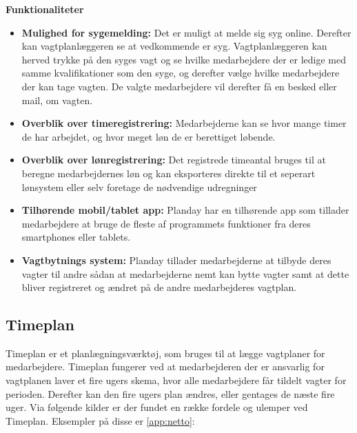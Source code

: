\noindent\textbf{Funktionaliteter}
\begin{itemize}
\item {\textbf{Mulighed for sygemelding:} Det er muligt at melde sig syg online. Derefter kan vagtplanlæggeren se at vedkommende er syg. Vagtplanlæggeren kan herved trykke på den syges vagt og se hvilke medarbejdere der er ledige med samme kvalifikationer som den syge, og derefter vælge hvilke medarbejdere der kan tage vagten. De valgte medarbejdere vil derefter få en besked eller mail, om vagten.}
\item {\textbf{Overblik over timeregistrering:} Medarbejderne kan se hvor mange timer de har arbejdet, og hvor meget løn de er berettiget løbende.}
\item{\textbf{Overblik over lønregistrering:} Det registrede timeantal bruges til at beregne medarbejdernes løn og kan eksporteres direkte til et seperart lønsystem eller selv foretage de nødvendige udregninger}
\item{\textbf{Tilhørende mobil/tablet app:} Planday har en tilhørende app som tillader medarbejdere at bruge de fleste af programmets funktioner fra deres smartphones eller tablets.}
\item{\textbf{Vagtbytnings system:} Planday tillader medarbejderne at tilbyde deres vagter til andre sådan at medarbejderne nemt kan bytte vagter samt at dette bliver registreret og ændret på de andre medarbejderes vagtplan.}
\end{itemize} 


\subsection{Timeplan}
Timeplan er et planlægningsværktøj, som bruges til at lægge vagtplaner for medarbejdere. Timeplan fungerer ved at medarbejderen der er ansvarlig for vagtplanen laver et fire ugers skema, hvor alle medarbejdere får tildelt vagter for perioden. Derefter kan den fire ugers plan ændres, eller gentages de næste fire uger. Via følgende kilder er der fundet en række fordele og ulemper ved Timeplan. Eksempler på disse er \citep{timeplan} \ref{app:netto}:

